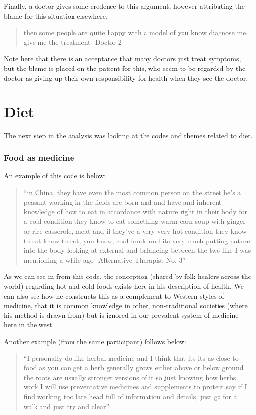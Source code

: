 Finally, a doctor gives some credence to this argument, however attributing the blame for this situation elsewhere. 

\begin{quotation}
  then some people are quite happy with a model of you know diagnose me, give me the treatment
-Doctor 2
\end{quotation}

Note here that there is an acceptance that many doctors just treat symptoms, but the blame is placed on the patient for this, who seem to be regarded by the doctor as giving up their own responsibility for health when they see the doctor. 

\section{Diet}
\label{sec:diet}

The next step in the analysis was looking at the codes and themes related to diet. 

\subsubsection{Food as medicine}



An example of this code is below:
\begin{quotation}
``in China, they have even the most common person on the street he's a peasant working in the fields are born and and have and inherent knowledge of how to eat in accordance with nature right in their body for a cold condition they know to eat something warm corn soup with ginger or rice casserole, meat and if they've a very very hot condition they know to eat know to eat, you know, cool foods and its very much putting nature into the body looking at external and balancing between the two like I was mentioning a while ago- Alternative Therapist No. 3''
  
\end{quotation}

As we can see in from this code, the conception (shared by folk healers across the world) regarding hot and cold foods exists here in his description of health. We can also see how he constructs this as a complement to Western styles of medicine, that it is common knowledge in other, non-traditional societies (where his method is drawn from) but is ignored in our prevalent system of medicine here in the west. 

Another example (from the same participant) follows below:
\begin{quotation}
``I personally do like herbal medicine and I think that its its as close to food as you can get a herb generally grows either above or below ground the roots are usually stronger versions of it so just knowing how herbs work I will use preventative medicines and supplements to protect say if I find working too late head full of information and details, just go for a walk and just try and clear''  
\end{quotation}


